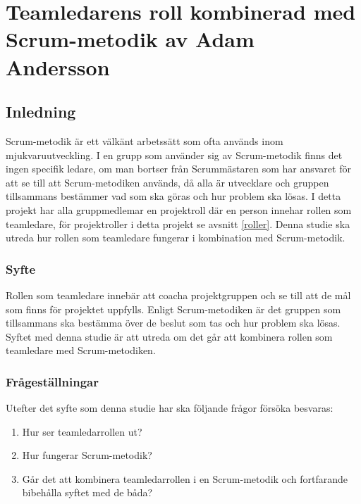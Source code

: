 \chapter{Teamledarens roll kombinerad med Scrum-metodik av Adam Andersson}

\section{Inledning}
Scrum-metodik är ett välkänt arbetssätt som ofta används inom mjukvaruutveckling. I en grupp som använder sig av Scrum-metodik finns det ingen specifik ledare, om man bortser från Scrummästaren som har ansvaret för att se till att Scrum-metodiken används, då alla är utvecklare och gruppen tillsammans bestämmer vad som ska göras och hur problem ska lösas.
I detta projekt har alla gruppmedlemar en projektroll där en person innehar rollen som teamledare, för projektroller i detta projekt se avsnitt \ref{roller}. Denna studie ska utreda hur rollen som teamledare fungerar i kombination med Scrum-metodik.

\subsection{Syfte}
Rollen som teamledare innebär att coacha projektgruppen och se till att de mål som finns för projektet uppfylls. Enligt Scrum-metodiken är det gruppen som tillsammans ska bestämma över de beslut som tas och hur problem ska lösas. Syftet med denna studie är att utreda om det går att kombinera rollen som teamledare med Scrum-metodiken.

\subsection{Frågeställningar}
Utefter det syfte som denna studie har ska följande frågor försöka besvaras:

\begin{enumerate}
	\item Hur ser teamledarrollen ut?
	\item Hur fungerar Scrum-metodik?
	\item Går det att kombinera teamledarrollen i en Scrum-metodik och fortfarande bibehålla syftet med de båda? 
\end{enumerate}

